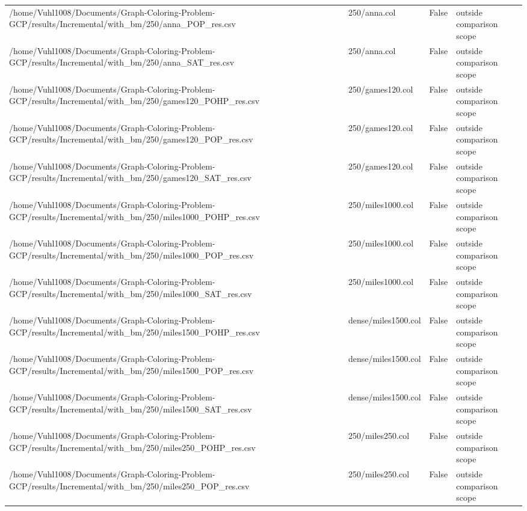 \begin{table}[htbp]
\begin{tabular}{llll}
/home/Vuhl1008/Documents/Graph-Coloring-Problem-GCP/results/Incremental/with\_bm/250/anna\_POP\_res.csv & 250/anna.col & False & outside comparison scope \\
/home/Vuhl1008/Documents/Graph-Coloring-Problem-GCP/results/Incremental/with\_bm/250/anna\_SAT\_res.csv & 250/anna.col & False & outside comparison scope \\
/home/Vuhl1008/Documents/Graph-Coloring-Problem-GCP/results/Incremental/with\_bm/250/games120\_POHP\_res.csv & 250/games120.col & False & outside comparison scope \\
/home/Vuhl1008/Documents/Graph-Coloring-Problem-GCP/results/Incremental/with\_bm/250/games120\_POP\_res.csv & 250/games120.col & False & outside comparison scope \\
/home/Vuhl1008/Documents/Graph-Coloring-Problem-GCP/results/Incremental/with\_bm/250/games120\_SAT\_res.csv & 250/games120.col & False & outside comparison scope \\
/home/Vuhl1008/Documents/Graph-Coloring-Problem-GCP/results/Incremental/with\_bm/250/miles1000\_POHP\_res.csv & 250/miles1000.col & False & outside comparison scope \\
/home/Vuhl1008/Documents/Graph-Coloring-Problem-GCP/results/Incremental/with\_bm/250/miles1000\_POP\_res.csv & 250/miles1000.col & False & outside comparison scope \\
/home/Vuhl1008/Documents/Graph-Coloring-Problem-GCP/results/Incremental/with\_bm/250/miles1000\_SAT\_res.csv & 250/miles1000.col & False & outside comparison scope \\
/home/Vuhl1008/Documents/Graph-Coloring-Problem-GCP/results/Incremental/with\_bm/250/miles1500\_POHP\_res.csv & dense/miles1500.col & False & outside comparison scope \\
/home/Vuhl1008/Documents/Graph-Coloring-Problem-GCP/results/Incremental/with\_bm/250/miles1500\_POP\_res.csv & dense/miles1500.col & False & outside comparison scope \\
/home/Vuhl1008/Documents/Graph-Coloring-Problem-GCP/results/Incremental/with\_bm/250/miles1500\_SAT\_res.csv & dense/miles1500.col & False & outside comparison scope \\
/home/Vuhl1008/Documents/Graph-Coloring-Problem-GCP/results/Incremental/with\_bm/250/miles250\_POHP\_res.csv & 250/miles250.col & False & outside comparison scope \\
/home/Vuhl1008/Documents/Graph-Coloring-Problem-GCP/results/Incremental/with\_bm/250/miles250\_POP\_res.csv & 250/miles250.col & False & outside comparison scope \\

\end{tabular}
\end{table}
